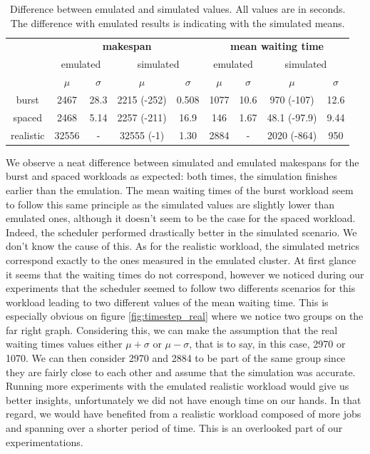 \begin{table}
	\centering
	\begin{tabular}{|c|c|c|c|c|c|c|c|c|}
		\hline

		\multirow{3}{*}{} & \multicolumn{4}{c|}{\textbf{makespan}} & \multicolumn{4}{c|}{\textbf{mean waiting time}}\\

		\cline{2-9}

		& \multicolumn{2}{c|}{emulated} &
		\multicolumn{2}{c|}{simulated} & \multicolumn{2}{c|}{emulated}
		& \multicolumn{2}{c|}{simulated} \\

		\cline{2-9}

		& $\mu$ & $\sigma$ & $\mu$ & $\sigma$ & $\mu$ & $\sigma$ & $\mu$ & $\sigma$ \\
		
		\hline

		burst & 2467 & 28.3 & 2215 (-252) & 0.508 & 1077 & 10.6 & 970 (-107) & 12.6 \\
		spaced & 2468 & 5.14 & 2257 (-211) & 16.9 & 146 & 1.67 & 48.1 (-97.9) & 9.44 \\
		realistic & 32556 & - & 32555 (-1) & 1.30 & 2884 & - & 2020 (-864) & 950 \\
		\hline
	\end{tabular}
	\caption{Difference between emulated and simulated values. All values
	are in seconds. The difference with emulated results is indicating with
the simulated means.}
	\label{tab:deviation}
\end{table}

We observe a neat difference between simulated and emulated makespans for the
burst and spaced workloads as expected: both times, the simulation finishes
earlier than the emulation. The mean waiting times of the burst workload seem
to follow this same principle as the simulated values are slightly lower than
emulated ones, although it doesn't seem to be the case for the spaced workload.
Indeed, the scheduler performed drastically better in the simulated scenario.
We don't know the cause of this. As for the realistic workload, the simulated
metrics correspond exactly to the ones measured in the emulated cluster. At
first glance it seems that the waiting times do not correspond, however we
noticed during our experiments that the scheduler seemed to follow two
differents scenarios for this workload leading to two different values of the
mean waiting time.  This is especially obvious on figure
\ref{fig:timestep_real} where we notice two groups on the far right graph.
Considering this, we can make the assumption that the real waiting times values
either $\mu + \sigma$ or $\mu - \sigma$, that is to say, in this case, 2970 or
1070. We can then consider 2970 and 2884 to be part of the same group since
they are fairly close to each other and assume that the simulation was
accurate. Running more experiments with the emulated realistic workload would
give us better insights, unfortunately we did not have enough time on our
hands. In that regard, we would have benefited from a realistic workload
composed of more jobs and spanning over a shorter period of time. This is an
overlooked part of our experimentations.

